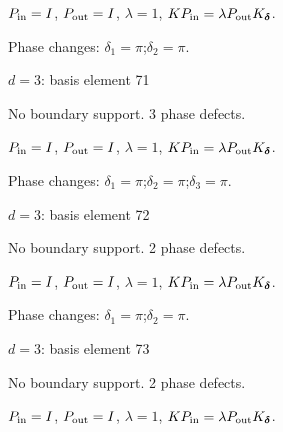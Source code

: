 \vspace{-1mm}
$P_{\rm in}=I$, \quad $P_{\rm out}=I$, \quad $\lambda=1$, \qquad $K P_{\rm in}=\lambda P_{\rm out}K_{\boldsymbol\delta}$.
\par\smallskip\begin{minipage}{.98\linewidth}\small Phase changes: $\delta_{1}=\pi$;\quad $\delta_{2}=\pi$.\end{minipage}
\vfill
{\footnotesize\texttt{}}
\newpage
{}
{\Large $d=3$: basis element 71}\par
No boundary support. 3 phase defects.
\begin{center}
\end{center}
\vspace{-1mm}
$P_{\rm in}=I$, \quad $P_{\rm out}=I$, \quad $\lambda=1$, \qquad $K P_{\rm in}=\lambda P_{\rm out}K_{\boldsymbol\delta}$.
\par\smallskip\begin{minipage}{.98\linewidth}\small Phase changes: $\delta_{1}=\pi$;\quad $\delta_{2}=\pi$;\quad $\delta_{3}=\pi$.\end{minipage}
\vfill
{\footnotesize\texttt{}}
\newpage
{}
{\Large $d=3$: basis element 72}\par
No boundary support. 2 phase defects.
\begin{center}
\end{center}
\vspace{-1mm}
$P_{\rm in}=I$, \quad $P_{\rm out}=I$, \quad $\lambda=1$, \qquad $K P_{\rm in}=\lambda P_{\rm out}K_{\boldsymbol\delta}$.
\par\smallskip\begin{minipage}{.98\linewidth}\small Phase changes: $\delta_{1}=\pi$;\quad $\delta_{2}=\pi$.\end{minipage}
\vfill
{\footnotesize\texttt{}}
\newpage
{}
{\Large $d=3$: basis element 73}\par
No boundary support. 2 phase defects.
\begin{center}
\end{center}
\vspace{-1mm}
$P_{\rm in}=I$, \quad $P_{\rm out}=I$, \quad $\lambda=1$, \qquad $K P_{\rm in}=\lambda P_{\rm out}K_{\boldsymbol\delta}$.
